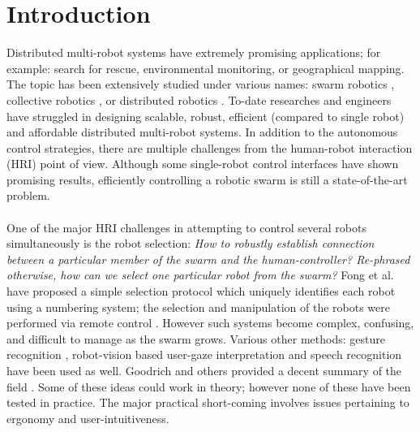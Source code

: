 \documentclass{svmult}
\begin{document}

\section{Introduction}
\label{sec:introduction}
Distributed multi-robot systems have extremely promising applications; for example: search for rescue, environmental monitoring, or geographical mapping. The topic has been extensively studied under various names: swarm robotics \cite{brambilla2013}, collective robotics \cite{kernbach2013handbook}, or distributed robotics \cite{martinoli2012distributed}. To-date researches and engineers have struggled in designing scalable, robust, efficient (compared to single robot) and affordable distributed multi-robot systems. In addition to the autonomous control strategies, there are multiple challenges from the human-robot interaction (HRI) point of view. Although some single-robot control interfaces have shown promising results, efficiently controlling a robotic swarm is still a state-of-the-art problem.\\
\\
One of the major HRI challenges in attempting to control several robots simultaneously is the robot selection: \textit{How to robustly establish connection between a particular member of the swarm and the human-controller? Re-phrased otherwise, how can we select one particular robot from the swarm?} Fong et al. have proposed a simple selection protocol which uniquely identifies each robot using a numbering system; the selection and manipulation of the robots were performed via remote control \cite{fong2003}. However such systems become complex, confusing, and difficult to manage as the swarm grows. Various other methods: gesture recognition \cite{Nagietal2014, Jones2010, Couture-Beil2010, Monajjemi2013}, robot-vision based user-gaze interpretation \cite{Couture-Beil2010, Monajjemi2013, Pourmehr2013} and speech recognition \cite{Pourmehr2013} have been used as well. Goodrich and others provided a decent summary of the field \cite{yanco2004classifying, goodrich2007human, Rule2012}. Some of these ideas could work in theory; however none of these have been tested in practice. The major practical short-coming involves issues pertaining to ergonomy and user-intuitiveness. \\
\\
\end{document}
